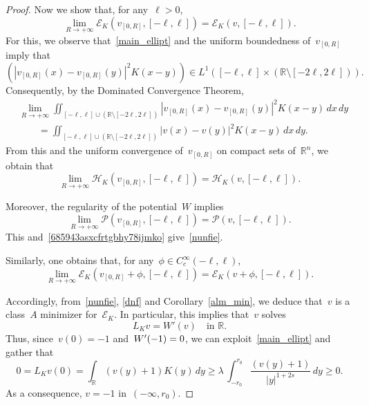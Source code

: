 \documentclass[10pt,a4paper]{amsart}
\numberwithin{equation}{section}
\newcommand{\R}{\mathbb{R}}
\newcommand{\Ec}{\mathcal{E}_K}
\newcommand{\Hc}{\mathcal{H}_K}
\newcommand{\Pc}{\mathcal{P}}
\begin{document}
\begin{proof}
Now we show that, for any~$\ell>0$,
\begin{equation} \label{nunfie}
\lim_{R\to +\infty} \Ec (v_{[0,R]},[-\ell,\ell]) = \Ec (v,[-\ell,\ell]).
\end{equation}
For this, we observe that~\eqref{main_ellipt} and the uniform boundedness of~$v_{[0,R]}$ imply that
\begin{equation*}
\left( | v_{[0,R]}(x)- v_{[0,R]}(y) |^2 K(x-y) \right) \in L^1([-\ell,\ell] \times(\R\setminus[-2\ell, 2\ell])).
\end{equation*}
Consequently, by the Dominated Convergence Theorem,
\begin{equation*}\begin{split}&
\lim_{R\to +\infty} \iint_{[-\ell,\ell]\cup (\R\setminus[-2\ell, 2\ell])}
|v_{[0,R]}(x)-v_{[0,R]}(y)|^2 K(x-y) \, dx\, dy\\&\qquad = 
\iint_{[-\ell,\ell]\cup (\R\setminus[-2\ell, 2\ell])}|v(x)-v(y)|^2 K(x-y) \, dx\, dy.
\end{split}
\end{equation*}
{F}rom this and the uniform convergence of~$v_{[0,R]}$
on compact sets of~$\R^n$,
we obtain that
\begin{equation}\label{685943asxcfrtgbhy78ijmko}
\lim_{R\to +\infty} \Hc (v_{[0,R]},[-\ell,\ell]) = \Hc (v,[-\ell,\ell]).
\end{equation}

Moreover, the regularity of the potential~$W$ implies
\begin{equation*}
\lim_{R\to +\infty} \Pc(v_{[0,R]},[-\ell,\ell]) = \Pc (v,[-\ell,\ell]).
\end{equation*}
This and~\eqref{685943asxcfrtgbhy78ijmko}
give~\eqref{nunfie}.

Similarly, one obtains that, for any~$\phi \in C_c^{\infty}(-\ell,\ell)$,
\begin{equation}\label{dnf}
\lim_{R\to +\infty} \Ec (v_{[0,R]}+\phi,[-\ell,\ell]) = \Ec (v+\phi,[-\ell,\ell]).
\end{equation}

Accordingly, from~\eqref{nunfie}, \eqref{dnf}
and Corollary~\ref{alm_min}, we deduce that~$v$
is a class~${A}$ minimizer for~$\Ec$.
In particular, this implies that~$v$ solves
\begin{equation*}
{L}_K v= W'(v) \quad\mbox{in } \R.
\end{equation*}
Thus, since~$v(0)=-1$ and~$W\rq{}(-1)=0$, we can exploit~\eqref{main_ellipt} %
and gather that
\begin{equation*}
0= {L}_K v (0) = \int_{\R}( v(y)+1) K(y)\, dy \geq \lambda \, \int_{-r_0}^{r_0} \frac{( v(y)+1)}{|y|^{1+2s}}\, dy \geq 0.
\end{equation*}
As a consequence, $v =-1$ in~$(-\infty,r_0)$. 


\end{proof}
\end{document}
